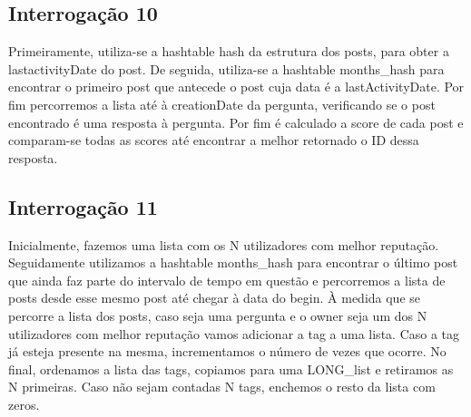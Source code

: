 \documentclass[10pt]{article}
\begin{document}
\subsection{Interrogação 10}

	Primeiramente, utiliza-se a hashtable hash da estrutura dos posts, para obter a lastactivityDate do post. De seguida, utiliza-se a hashtable months\_hash para encontrar o primeiro post que antecede o post cuja data é a lastActivityDate. Por fim percorremos a lista até à creationDate da pergunta, verificando se o post encontrado é uma resposta à pergunta. Por fim é calculado a score de cada post e comparam-se todas as scores até encontrar a melhor retornado o ID dessa resposta.

\subsection{Interrogação 11}

	Inicialmente, fazemos uma lista com os N utilizadores com melhor reputação. Seguidamente utilizamos a hashtable months\_hash para encontrar o último post que ainda faz parte do intervalo de tempo em questão e percorremos a lista de posts desde esse mesmo post até chegar à data do begin. À medida que se percorre a lista dos posts, caso seja uma pergunta e o owner seja um dos N utilizadores com melhor reputação vamos adicionar a tag a uma lista. Caso a tag já esteja presente na mesma, incrementamos o número de vezes que ocorre. No final, ordenamos a lista das tags, copiamos para uma LONG\_list e retiramos as N primeiras. Caso não sejam contadas N tags, enchemos o resto da lista com zeros.
\end{document}

